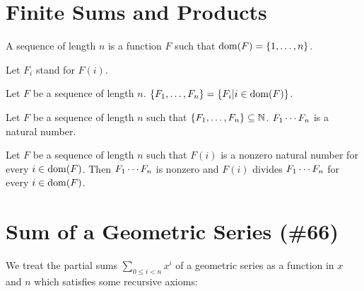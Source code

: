 \documentclass{article}
\begin{document}
\section{Finite Sums and Products}

\begin{forthel}

\begin{definition}
A sequence of length $n$ is a
function $F$ such that $\operatorname{dom}(F) = \{1,\dots,n\}$.
\end{definition}

Let $F_{i}$ stand for $F(i)$.

\begin{definition}
Let $F$ be a sequence of length $n$.
$\{F_{1},\dots,F_{n}\} = \{ F_{i} | i \in \operatorname{dom}(F)\}$.
\end{definition}





\begin{signature}
Let $F$ be a sequence of length $n$
such that $\{F_{1},\dots,F_{n}\} \subseteq \mathbb{N}$.
$F_{1} \cdots F_{n}$ is a natural number.
\end{signature}

\begin{axiom}[Factorproperty]
Let $F$ be a sequence of length $n$
such that $F(i)$ is a nonzero natural number for every $i \in \operatorname{dom}(F)$.
Then $F_{1} \cdots F_{n}$ is nonzero and
$F(i)$ divides $F_{1} \cdots F_{n}$ for every $i \in \operatorname{dom}(F)$.
\end{axiom}

\end{forthel}

\section{Sum of a Geometric Series (\#66)}

\newcommand{\sumgeom}[2]{\sum_{0 \leq i < #2} {#1}^i}


We treat the partial sums $\sumgeom{x}{n}$ of a geometric
series as a function in $x$ and $n$ which satisfies some
recursive axioms:
\end{document}
